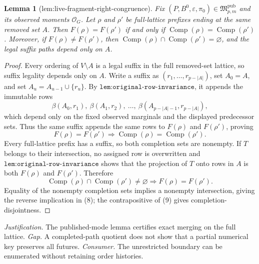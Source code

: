 \documentclass{article}
\newtheorem{lemma}{Lemma}
\begin{document}
\begin{lemma}[lem:live-fragment-right-congruence]\label{lem:live-fragment-right-congruence}
Fix \((P,B^0,\varepsilon,\pi_0)\in\mathfrak M_{p,m}^{\mathrm{pub}}\) and its observed moments \(\mathcal O_G\). Let \(\rho\) and \(\rho'\) be full-lattice prefixes ending at the same removed set \(A\). Then \(F(\rho)=F(\rho')\) if and only if \(\operatorname{Comp}(\rho)=\operatorname{Comp}(\rho')\). Moreover, if \(F(\rho)\ne F(\rho')\), then \(\operatorname{Comp}(\rho)\cap\operatorname{Comp}(\rho')=\varnothing\), and the legal suffix paths depend only on \(A\).
\end{lemma}
\begin{proof}
Every ordering of \(V\setminus A\) is a legal suffix in the full removed-set lattice, so suffix legality depends only on \(A\).  Write a suffix as \((r_1,\ldots,r_{p-|A|})\), set \(A_0=A\), and set \(A_u=A_{u-1}\cup\{r_u\}\).  By \(\texttt{lem:original-row-invariance}\), it appends the immutable rows
\[
 \beta(A_0,r_1),\ \beta(A_1,r_2),\ \ldots,\
 \beta(A_{p-|A|-1},r_{p-|A|}),
 \tag{7}
\]
which depend only on the fixed observed marginals and the displayed predecessor sets.  Thus the same suffix appends the same rows to \(F(\rho)\) and \(F(\rho')\), proving
\[
 F(\rho)=F(\rho')
 \Longrightarrow
 \operatorname{Comp}(\rho)=\operatorname{Comp}(\rho').
 \tag{8}
\]
Every full-lattice prefix has a suffix, so both completion sets are nonempty.  If \(T\) belongs to their intersection, no assigned row is overwritten and \(\texttt{lem:original-row-invariance}\) shows that the projection of \(T\) onto rows in \(A\) is both \(F(\rho)\) and \(F(\rho')\).  Therefore
\[
 \operatorname{Comp}(\rho)\cap\operatorname{Comp}(\rho')\ne\varnothing
 \Longrightarrow F(\rho)=F(\rho').
 \tag{9}
\]
Equality of the nonempty completion sets implies a nonempty intersection, giving the reverse implication in (8); the contrapositive of (9) gives completion-disjointness.
\end{proof}
\par\smallskip\noindent \textit{Justification.} The published-mode lemma certifies exact merging on the full lattice. \textit{Gap.} A completed-path quotient does not show that a partial numerical key preserves all futures. \textit{Consumer.} The unrestricted boundary can be enumerated without retaining order histories.
\end{document}
